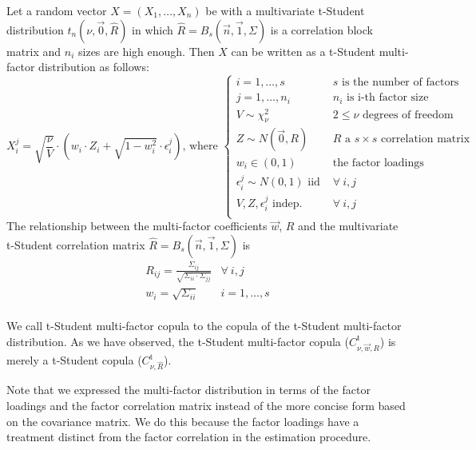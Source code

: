 \documentclass[11pt,fleqn]{book} %
\begin{document}
\begin{proposition}
	\label{prop:tmfm}
	Let a random vector $X=(X_1,\dots,X_n)$ be with a multivariate t-Student 
	distribution $t_n(\nu,\vec{0},\widehat{R})$ in which 
	$\widehat{R} = B_s(\vec{n},\vec{1},\Sigma)$ is a correlation block matrix 
	and $n_i$ sizes are high enough. Then $X$ can be written as a t-Student 
	multi-factor distribution as follows:
	\begin{displaymath}
		X_i^j = \sqrt{\frac{\nu}{V}} \cdot 
		\left( w_i \cdot Z_i + \sqrt{1-w_i^2} \cdot \epsilon_i^j \right)
		\text{, where } \left\{
		\begin{array}{ll}
			i = 1, \dots, s & \text{$s$ is the number of factors} \\
			j = 1, \dots, n_i & \text{$n_i$ is i-th factor size} \\
			V \sim \chi_{\nu}^2 & 2 \le \nu \text{ degrees of freedom} \\
			Z \sim N(\vec{0},R) & \text{$R$ a $s {\times} s$ correlation matrix} \\
			w_i \in (0,1) & \text{the factor loadings } \\
			\epsilon_i^j \sim N(0,1) \text { iid } & \forall\ i,j \\
			V, Z, \epsilon_i^j \text{ indep. } & \forall\ i,j \\
		\end{array}
		\right.
	\end{displaymath}
	The relationship between the multi-factor coefficients $\vec{w}$, $R$ 
	and the multivariate t-Student correlation matrix 
	$\widehat{R} = B_s(\vec{n},\vec{1},\Sigma)$ is
	\begin{displaymath}
		\begin{array}{ll}
			R_{ij} = \frac{\Sigma_{ij}}{\sqrt{\Sigma_{ii} \cdot \Sigma_{jj}}} & \forall\ i,j \\
			w_i = \sqrt{\Sigma_{ii}} & i = 1,\dots,s \\
		\end{array}
	\end{displaymath}
\end{proposition}

We call t-Student multi-factor copula to the copula of the t-Student 
multi-factor distribution. As we have observed, the t-Student multi-factor 
copula ($C_{\nu,\vec{w},R}^{\text{t}}$) is merely a t-Student copula 
($C_{\nu,\widehat{R}}^{\text{t}}$).

Note that we expressed the multi-factor distribution in terms of the factor 
loadings and the factor correlation matrix instead of the more concise form 
based on the covariance matrix. We do this because the factor loadings have 
a treatment distinct from the factor correlation in the estimation procedure.
\end{document}
